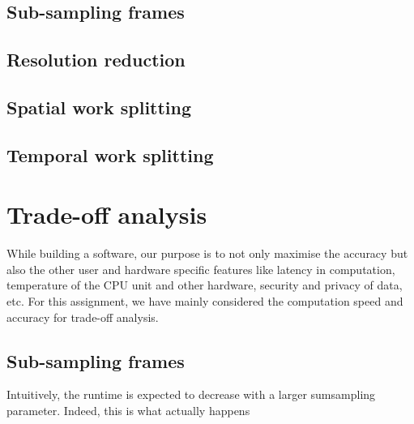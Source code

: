 \documentclass{article}
\begin{document}
\subsection{Sub-sampling frames}
\subsection{Resolution reduction}
\subsection{Spatial work splitting}
\subsection{Temporal work splitting}

\section{Trade-off analysis}
While building a software, our purpose is to not only maximise the accuracy but also the other user and hardware specific features like latency in computation, temperature of the CPU unit and other hardware, security and privacy of data, etc. For this assignment, we have mainly considered the computation speed and accuracy for trade-off analysis.
\subsection{Sub-sampling frames}
Intuitively, the runtime is expected to decrease with a larger sumsampling parameter. Indeed, this is what actually happens


\end{document}

